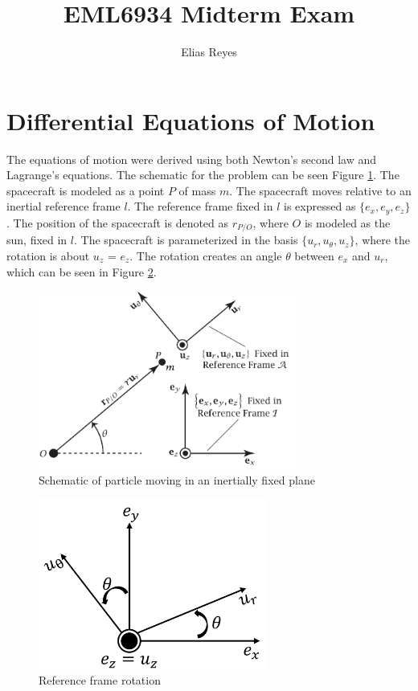 \documentclass[]{article}
\title{EML6934 Midterm Exam}
\author{Elias Reyes}
\begin{document}
\maketitle



\section{Differential Equations of Motion}
The equations of motion were derived using both Newton's second law and Lagrange's equations. The schematic for the problem can be seen Figure \ref{fig:schematic}. The spacecraft is modeled as a point \(P\) of  mass \(m\). The spacecraft moves relative to an inertial reference frame \(l\). The reference frame fixed in \(l\) is expressed as \(\{e_{x},e_{y},e_{z}\}\). The position of the spacecraft is denoted as \(r_{P/O}\), where \(O\) is modeled as the sun, fixed in \(l\). The spacecraft is parameterized in the basis \(\{u_{r},u_{\theta},u_{z}\}\), where the rotation is about \(u_{z}\) = \(e_{z}\). The rotation creates an angle \(\theta\) between \(e_{x}\) and \(u_{r}\), which can be seen in Figure \ref{fig:rotation2}.
\begin{figure}
	\centering
    \includegraphics[width=85mm,scale=0.85]{midterm_schematic.png}
	\caption{Schematic of particle moving in an inertially fixed plane}
	\label{fig:schematic}
\end{figure}
\begin{figure}
	\centering
	\includegraphics[width=75mm,scale=0.75]{rotation.png}
	\caption{Reference frame rotation}
	\label{fig:rotation2}
\end{figure}
\end{document}
